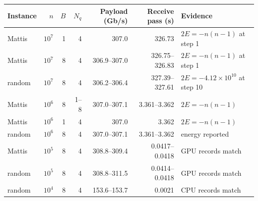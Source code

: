 \begin{tabular}{lrrrrrl}\toprule
Instance & $n$ & $B$ & $N_q$ & Payload (Gb/s) & Receive pass (s) & Evidence \\ \midrule
Mattis & $10^7$ & 1 & 4 & 307.0 & 326.73 & $2E=-n(n-1)$ at step 1 \\
Mattis & $10^7$ & 8 & 4 & 306.9--307.0 & 326.75--326.83 & $2E=-n(n-1)$ at step 1 \\
random & $10^7$ & 8 & 4 & 306.2--306.4 & 327.39--327.61 & $2E=-4.12\times10^{10}$ at step 10 \\
Mattis & $10^6$ & 8 & 1--8 & 307.0--307.1 & 3.361--3.362 & $2E=-n(n-1)$ \\
Mattis & $10^6$ & 1 & 4 & 307.0 & 3.362 & $2E=-n(n-1)$ \\
random & $10^6$ & 8 & 4 & 307.0--307.1 & 3.361--3.362 & energy reported \\
Mattis & $10^5$ & 8 & 4 & 308.8--309.4 & 0.0417--0.0418 & GPU records match \\
random & $10^5$ & 8 & 4 & 308.8--311.5 & 0.0414--0.0418 & GPU records match \\
random & $10^4$ & 8 & 4 & 153.6--153.7 & 0.0021 & CPU records match \\
\bottomrule
\end{tabular}
